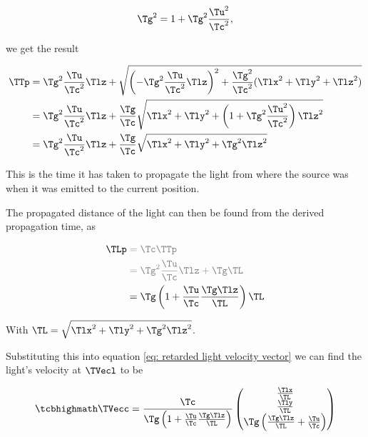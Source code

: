 \begin{derivation}
	\begin{equation}
		\Tg ^2 = 1+\Tg ^2\frac{\Tu ^2}{\Tc ^2},
	\end{equation}

	we get the result

	\begin{equation}
		\begin{aligned}
			\TTp  & = \Tg ^2\frac{\Tu }{\Tc ^2} \Tlz  + \sqrt{\left(-\Tg ^2\frac{\Tu }{\Tc ^2} \Tlz  \right)^2+\frac{\Tg ^2}{\Tc ^2}(\Tlx ^2 + \Tly ^2+ \Tlz ^2)} \\
			    & = \Tg ^2\frac{\Tu }{\Tc ^2} \Tlz  + \frac{\Tg }{\Tc }\sqrt{\Tlx ^2+ \Tly ^2+\left(1+\Tg ^2\frac{\Tu ^2}{\Tc ^2}\right) \Tlz ^2}               \\
			    & = \Tg ^2\frac{\Tu }{\Tc ^2} \Tlz  + \frac{\Tg }{\Tc }\sqrt{\Tlx ^2 + \Tly ^2+\Tg ^2 \Tlz ^2}
		\end{aligned}
	\end{equation}

	This is the time it has taken to propagate the light from where the source was when it was emitted to the current position.

\end{derivation}

The propagated distance of the light can then be found from the derived propagation time, as

\begin{equation}
	\label{eq: propagation distance}
	\begin{aligned}
		\TLp  & \color{gray} = \Tc  \TTp                                              \\
		      & \color{gray} = \Tg ^2 \frac{\Tu }{\Tc } \Tlz  + \Tg   \TL             \\
		      & = \Tg  \left( 1 + \frac{\Tu }{\Tc } \frac{\Tg  \Tlz  }{\TL } \right) \TL
	\end{aligned}
\end{equation}

With $ \TL =\sqrt{\Tlx ^2+\Tly ^2+\Tg ^2 \Tlz ^2}$.

Substituting this into equation \eqref{eq: retarded light velocity vector} we can find the light's velocity at $\TVecl $ to be

\begin{equation}
	\label{eq: direction of light from moving source}
	\mhl{
		\TVecc  =
		\frac{\Tc }{\Tg  \left( 1 + \frac{\Tu }{\Tc } \frac{\Tg  \Tlz  }{\TL } \right)}
		\begin{pmatrix}
			\frac{\Tlx  }{\TL } \\
			\frac{\Tly  }{\TL } \\
			\Tg  \left( \frac{\Tg  \Tlz  }{\TL } + \frac{\Tu }{\Tc } \right)
		\end{pmatrix}
	}
\end{equation}

